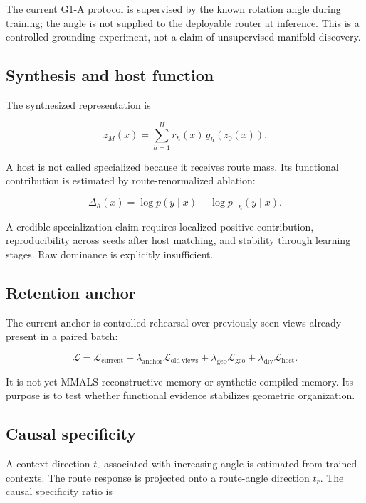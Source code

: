 \documentclass[11pt,a4paper]{article}
\newcommand{\loss}{\mathcal{L}}
\begin{document}
The current G1-A protocol is supervised by the known rotation angle during training; the angle is not supplied to the deployable router at inference. This is a controlled grounding experiment, not a claim of unsupervised manifold discovery.

\subsection{Synthesis and host function}

The synthesized representation is

\begin{equation}
 z_M(x)=\sum_{h=1}^{H} r_h(x)\,g_h(z_0(x)).
\end{equation}

A host is not called specialized because it receives route mass. Its functional contribution is estimated by route-renormalized ablation:

\begin{equation}
 \Delta_h(x)=\log p(y\mid x)-\log p_{-h}(y\mid x).
\end{equation}

A credible specialization claim requires localized positive contribution, reproducibility across seeds after host matching, and stability through learning stages. Raw dominance is explicitly insufficient.

\subsection{Retention anchor}

The current anchor is controlled rehearsal over previously seen views already present in a paired batch:

\begin{equation}
 \loss = \loss_{\mathrm{current}}
 + \lambda_{\mathrm{anchor}}\loss_{\mathrm{old\ views}}
 + \lambda_{\mathrm{geo}}\loss_{\mathrm{geo}}
 + \lambda_{\mathrm{div}}\loss_{\mathrm{host}}.
\end{equation}

It is not yet MMALS reconstructive memory or synthetic compiled memory. Its purpose is to test whether functional evidence stabilizes geometric organization.

\subsection{Causal specificity}

A context direction $t_c$ associated with increasing angle is estimated from trained contexts. The route response is projected onto a route-angle direction $t_r$. The causal specificity ratio is
\end{document}
